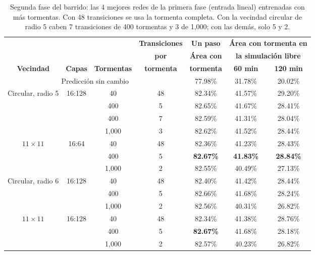 \begin{table}[htbp]
	\centering
	\footnotesize
	\setlength{\tabcolsep}{4pt}
	\begin{tabular}{@{}ccccccc@{}}
		\toprule
		& & & \textbf{Transiciones} & \textbf{Un paso} & \multicolumn{2}{c}{\textbf{Área con tormenta en}} \\
		& & & \textbf{por} & \textbf{Área con} & \multicolumn{2}{c}{\textbf{la simulación libre}} \\
		\cmidrule(l){6-7}
		\textbf{Vecindad} & \textbf{Capas} & \textbf{Tormentas} & \textbf{tormenta} & \textbf{tormenta} & \textbf{60 min} & \textbf{120 min} \\ \midrule
		\multicolumn{4}{c}{Predicción sin cambio} & 77.98\% & 31.78\% & 20.02\%  \\ \midrule
		\multirow{4}{*}{Circular, radio 5} & \multirow{4}{*}{16:128} & 40 & 48 & 82.34\% & 41.57\% & 29.20\%  \\
		& & 400 & 5 & 82.65\% & 41.67\% & 28.41\% \\
		& & 400 & 7 & 82.59\% & 41.31\% & 28.04\% \\
		& & 1,000 & 3 & 82.62\% & 41.52\% & 28.44\%  \\ \midrule
		\multirow{3}{*}{$11 \times 11$} & \multirow{3}{*}{16:64} & 40 & 48 & 82.36\% & 41.23\% & 28.43\% \\
		& & 400 & 5 & \textbf{82.67\%} & \textbf{41.83\%} & \textbf{28.84\%}  \\
		& & 1,000 & 2 & 82.55\% & 40.49\% & 27.13\%  \\ \midrule
		\multirow{3}{*}{Circular, radio 6} & \multirow{3}{*}{16:128} & 40 & 48 & 82.40\% & 41.42\% & 28.44\% \\
		& & 400 & 5 & 82.66\% & 41.68\% & 28.24\%  \\
		& & 1,000 & 2 & 82.56\% & 40.31\% & 26.82\%  \\ \midrule
		\multirow{3}{*}{$11 \times 11$} & \multirow{3}{*}{16:128} & 40 & 48 & 82.34\% & 41.38\% & 28.76\%  \\
		& & 400 & 5 & \textbf{82.67\%} & 41.68\% & 28.18\% \\
		& & 1,000 & 2 & 82.57\% & 40.23\% & 26.82\%  \\
		\bottomrule
	\end{tabular}
	\caption{Segunda fase del barrido: las 4 mejores redes de la primera fase (entrada lineal) entrenadas con más tormentas. Con 48 transiciones se usa la tormenta completa. Con la vecindad circular de radio 5 caben 7 transiciones de 400 tormentas y 3 de 1,000; con las demás, solo 5 y 2.}
	\label{tab:sevir_barrido_tormentas}
\end{table}

